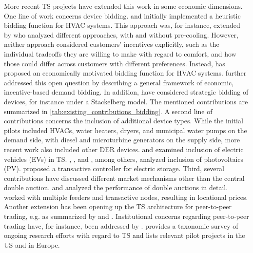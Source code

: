 More recent TS projects have extended this work in some economic dimensions. 
One line of work concerns device bidding.
\citet{PNNL2006} and \citet{hammerstrom_2008} initially implemented a heuristic bidding function for HVAC systems. This approach was, for instance, extended by \citet{adhikari_simulation_2016} who analyzed different approaches, with and without pre-cooling.
However, neither approach considered customers' incentives explicitly, such as the individual tradeoffs they are willing to make with regard to comfort, and how those could differ across customers with different preferences.
Instead, \citet{Arlt2020} has proposed an economically motivated bidding function for HVAC systems.
\citet{widergren_transactive_2017} further addressed this open question by describing a general framework of economic, incentive-based demand bidding.
In addition, \citet{lian_transactive_2020} have considered strategic bidding of devices, for instance under a Stackelberg model. The mentioned contributions are summarized in \cref{tab:existing_contributions_bidding}.
A second line of contributions concerns the inclusion of additional device types. While the initial pilots included HVACs, water heaters, dryers, and municipal water pumps on the demand side, with diesel and microturbine generators on the supply side, more recent work also included other DER devices.
\citet{behboodi_integration_2016} and \citet{behboodi_electric_2016} examined inclusion of electric vehicles (EVs) in TS. 
\citet{sajjadi_transactive_2016}, \citet{ableitner_user_2020}, and \citet{mengelkamp_decentralizing_2018}, among others, analyzed inclusion of photovoltaics (PV).
\citet{parandehgheibi_two-layer_2017} proposed a transactive controller for electric storage.
Third, several contributions have discussed different market mechanisms other than the central double auction. \citet{fuller_analysis_2011} and \citet{Arlt2020} analyzed the performance of double auctions in detail. \citet{widergren_residential_2014} worked with multiple feeders and transactive nodes, resulting in locational prices. Another extension has been opening up the TS architecture for peer-to-peer trading, e.g. as summarized by \citet{zhang_review_2017} and \citet{sousa_peer--peer_2019}.
Institutional concerns regarding peer-to-peer trading have, for instance, been addressed by \citet{masiello_sharing_2016}.
\citet{abrishambaf_towards_2019} provides a taxonomic survey of ongoing research efforts with regard to TS and lists relevant pilot projects in the US and in Europe. 

